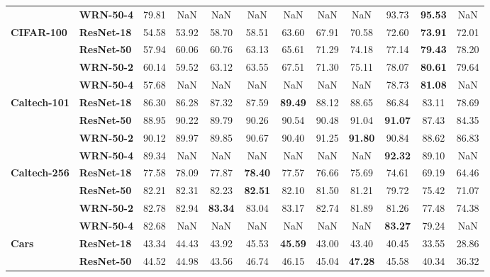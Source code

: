 \begin{table}
\begin{tabular}{l|l|cccccccccc}
       & \textbf{WRN-50-4} &             79.81 &   NaN &   NaN &   NaN &   NaN &   NaN &   NaN & 93.73 & \textbf{95.53} &   NaN \\
\cline{1-12}
\multirow{4}{*}{\textbf{CIFAR-100}} & \textbf{ResNet-18} &             54.58 & 53.92 & 58.70 & 58.51 & 63.60 & 67.91 & 70.58 & 72.60 & \textbf{73.91} & 72.01 \\
       & \textbf{ResNet-50} &             57.94 & 60.06 & 60.76 & 63.13 & 65.61 & 71.29 & 74.18 & 77.14 & \textbf{79.43} & 78.20 \\
       & \textbf{WRN-50-2} &             60.14 & 59.52 & 63.12 & 63.55 & 67.51 & 71.30 & 75.11 & 78.07 & \textbf{80.61} & 79.64 \\
       & \textbf{WRN-50-4} &             57.68 &   NaN &   NaN &   NaN &   NaN &   NaN &   NaN & 78.73 & \textbf{81.08} &   NaN \\
\cline{1-12}
\multirow{4}{*}{\textbf{Caltech-101}} & \textbf{ResNet-18} &             86.30 & 86.28 & 87.32 & 87.59 & \textbf{89.49} & 88.12 & 88.65 & 86.84 & 83.11 & 78.69 \\
       & \textbf{ResNet-50} &             88.95 & 90.22 & 89.79 & 90.26 & 90.54 & 90.48 & 91.04 & \textbf{91.07} & 87.43 & 84.35 \\
       & \textbf{WRN-50-2} &             90.12 & 89.97 & 89.85 & 90.67 & 90.40 & 91.25 & \textbf{91.80} & 90.84 & 88.62 & 86.83 \\
       & \textbf{WRN-50-4} &             89.34 &   NaN &   NaN &   NaN &   NaN &   NaN &   NaN & \textbf{92.32} & 89.10 &   NaN \\
\cline{1-12}
\multirow{4}{*}{\textbf{Caltech-256}} & \textbf{ResNet-18} &             77.58 & 78.09 & 77.87 & \textbf{78.40} & 77.57 & 76.66 & 75.69 & 74.61 & 69.19 & 64.46 \\
       & \textbf{ResNet-50} &             82.21 & 82.31 & 82.23 & \textbf{82.51} & 82.10 & 81.50 & 81.21 & 79.72 & 75.42 & 71.07 \\
       & \textbf{WRN-50-2} &             82.78 & 82.94 & \textbf{83.34} & 83.04 & 83.17 & 82.74 & 81.89 & 81.26 & 77.48 & 74.38 \\
       & \textbf{WRN-50-4} &             82.68 &   NaN &   NaN &   NaN &   NaN &   NaN &   NaN & \textbf{83.27} & 79.24 &   NaN \\
\cline{1-12}
\multirow{4}{*}{\textbf{Cars}} & \textbf{ResNet-18} &             43.34 & 44.43 & 43.92 & 45.53 & \textbf{45.59} & 43.00 & 43.40 & 40.45 & 33.55 & 28.86 \\
       & \textbf{ResNet-50} &             44.52 & 44.98 & 43.56 & 46.74 & 46.15 & 45.04 & \textbf{47.28} & 45.58 & 40.34 & 36.32 \\

\end{tabular}
\end{table}
